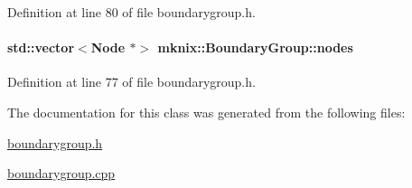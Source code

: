 Definition at line 80 of file boundarygroup.\+h.

\hypertarget{classmknix_1_1_boundary_group_ac38d6a03d7b780a8d34bf0658b392913}{}
\paragraph[{nodes}]{\setlength{\rightskip}{0pt plus 5cm}std\+::vector$<${\bf Node} $\ast$$>$ mknix\+::\+Boundary\+Group\+::nodes\hspace{0.3cm}{\ttfamily [protected]}}\label{classmknix_1_1_boundary_group_ac38d6a03d7b780a8d34bf0658b392913}


Definition at line 77 of file boundarygroup.\+h.



The documentation for this class was generated from the following files\+:\begin{DoxyCompactItemize}
\item 
\hyperlink{boundarygroup_8h}{boundarygroup.\+h}\item 
\hyperlink{boundarygroup_8cpp}{boundarygroup.\+cpp}\end{DoxyCompactItemize}
